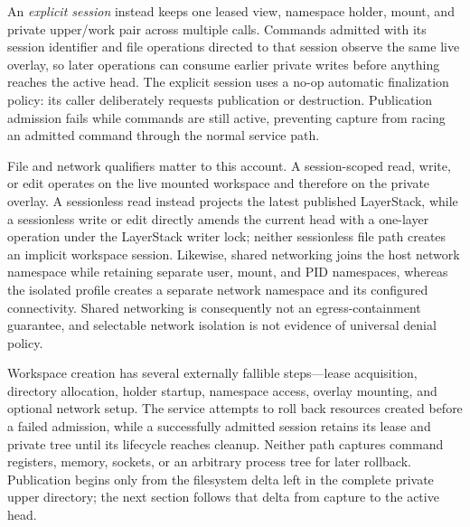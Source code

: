 An \emph{explicit session} instead keeps one leased view, namespace holder,
mount, and private upper/work pair across multiple calls.  Commands admitted
with its session identifier and file operations directed to that session
observe the same live overlay, so later operations can consume earlier private
writes before anything reaches the active head.  The explicit session uses a
no-op automatic finalization policy: its caller deliberately requests
publication or destruction.  Publication admission fails while commands are
still active, preventing capture from racing an admitted command through the
normal service path.

File and network qualifiers matter to this account.  A session-scoped read,
write, or edit operates on the live mounted workspace and therefore on the
private overlay.  A sessionless read instead projects the latest published
LayerStack, while a sessionless write or edit directly amends the current head
with a one-layer operation under the LayerStack writer lock; neither
sessionless file path creates an implicit workspace session.  Likewise,
shared networking joins the host network namespace while retaining separate
user, mount, and PID namespaces, whereas the isolated profile creates a
separate network namespace and its configured connectivity.  Shared
networking is consequently not an egress-containment guarantee, and selectable
network isolation is not evidence of universal denial policy.

Workspace creation has several externally fallible steps---lease acquisition,
directory allocation, holder startup, namespace access, overlay mounting, and
optional network setup.  The service attempts to roll back resources created
before a failed admission, while a successfully admitted session retains its
lease and private tree until its lifecycle reaches cleanup.  Neither path
captures command registers, memory, sockets, or an arbitrary process tree for
later rollback.  Publication begins only from the filesystem delta left in the
complete private upper directory; the next section follows that delta from
capture to the active head.
